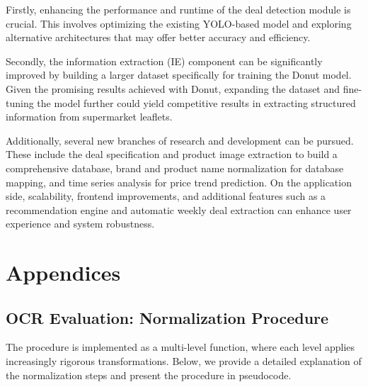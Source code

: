 \documentclass[11pt]{article}
\begin{document}
    Firstly, enhancing the performance and runtime of the deal detection module is crucial. This involves optimizing the existing YOLO-based model and exploring alternative architectures that may offer better accuracy and efficiency.

    Secondly, the information extraction (IE) component can be significantly improved by building a larger dataset specifically for training the Donut model. Given the promising results achieved with Donut, expanding the dataset and fine-tuning the model further could yield competitive results in extracting structured information from supermarket leaflets.

    Additionally, several new branches of research and development can be pursued. These include the deal specification and product image extraction to build a comprehensive database, brand and product name normalization for database mapping, and time series analysis for price trend prediction. On the application side, scalability, frontend improvements, and additional features such as a recommendation engine and automatic weekly deal extraction can enhance user experience and system robustness.


\newpage

\appendix
\section*{Appendices}
\renewcommand{\thesubsection}{\Alph{subsection}}

\subsection{OCR Evaluation: Normalization Procedure}
\label{app:ocr_normalization}
The procedure is implemented as a multi-level function, where each level applies increasingly rigorous transformations. Below, we provide a detailed explanation of the normalization steps and present the procedure in pseudocode.
\end{document}
